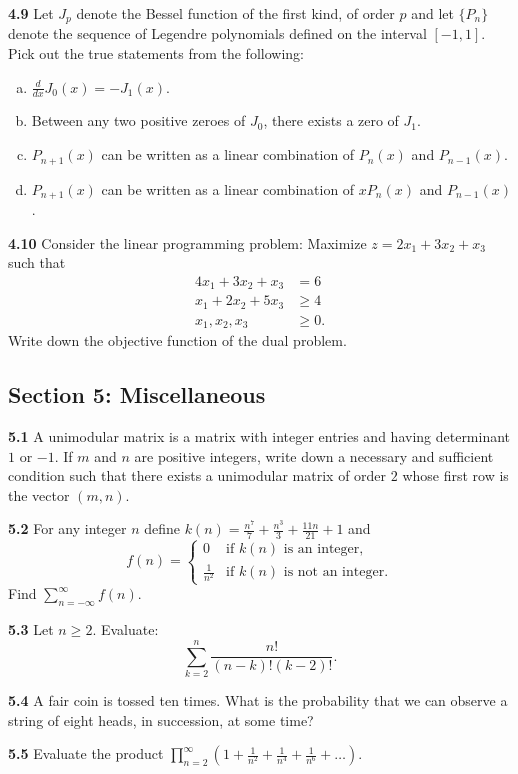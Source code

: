 \documentclass[11pt,a4paper]{article}
\newcommand{\examsec}[1]{%
  \subsection*{#1}
  \vspace{-2pt}
}
\newcommand{\qitem}[1]{\par\medskip\noindent\textbf{#1}\hspace{0.5em}}
\begin{document}
\qitem{4.9} Let $J_p$ denote the Bessel function of the first kind, of order $p$ and let $\{P_n\}$ denote the sequence of Legendre polynomials defined on the interval $[-1, 1]$. Pick out the true statements from the following:
\begin{enumerate}[a.]
  \item $\frac{d}{dx} J_0(x) = -J_1(x)$.
  \item Between any two positive zeroes of $J_0$, there exists a zero of $J_1$.
  \item $P_{n+1}(x)$ can be written as a linear combination of $P_n(x)$ and $P_{n-1}(x)$.
  \item $P_{n+1}(x)$ can be written as a linear combination of $xP_n(x)$ and $P_{n-1}(x)$.
\end{enumerate}

\qitem{4.10} Consider the linear programming problem: Maximize $z = 2x_1 + 3x_2 + x_3$ such that
\begin{align*}
  4x_1 + 3x_2 + x_3 &= 6 \\
  x_1 + 2x_2 + 5x_3 &\ge 4 \\
  x_1, x_2, x_3 &\ge 0.
\end{align*}
Write down the objective function of the dual problem.

\examsec{Section 5: Miscellaneous}

\qitem{5.1} A unimodular matrix is a matrix with integer entries and having determinant $1$ or $-1$. If $m$ and $n$ are positive integers, write down a necessary and sufficient condition such that there exists a unimodular matrix of order $2$ whose first row is the vector $(m, n)$.

\qitem{5.2} For any integer $n$ define $k(n) = \frac{n^7}{7} + \frac{n^3}{3} + \frac{11n}{21} + 1$ and
\[
  f(n) = \begin{cases} 0 & \text{if } k(n) \text{ is an integer,} \\ \frac{1}{n^2} & \text{if } k(n) \text{ is not an integer.} \end{cases}
\]
Find $\sum_{n=-\infty}^{\infty} f(n)$.

\qitem{5.3} Let $n \ge 2$. Evaluate:
\[
  \sum_{k=2}^{n} \frac{n!}{(n-k)!(k-2)!}.
\]

\qitem{5.4} A fair coin is tossed ten times. What is the probability that we can observe a string of eight heads, in succession, at some time?

\qitem{5.5} Evaluate the product $\prod_{n=2}^{\infty} \left(1 + \frac{1}{n^2} + \frac{1}{n^4} + \frac{1}{n^6} + \dots\right)$.
\end{document}
